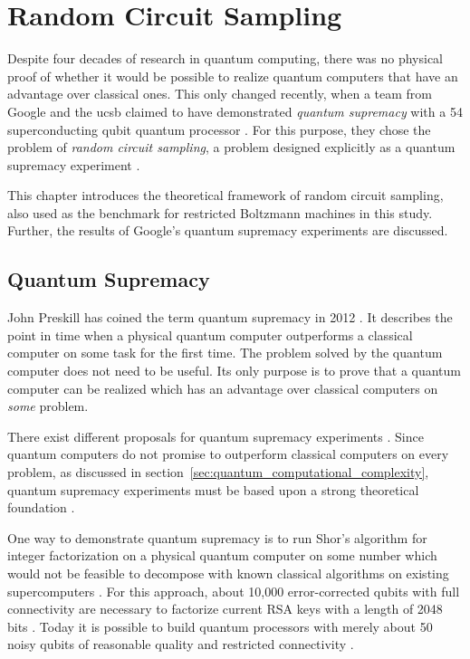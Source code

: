 \chapter{Random Circuit Sampling}
\label{sec:rcs}

Despite four decades
of research in quantum computing, 
there was no physical proof of whether it would be possible to realize quantum computers
that have an advantage over classical ones. This only changed
recently, when a team from Google and the \gls{ucsb} claimed to have demonstrated \textit{quantum supremacy}
with a 54 superconducting qubit quantum processor \cite{martines2019supremacy}. For this purpose, they
chose the problem of \textit{random circuit sampling}, a problem designed explicitly
as a quantum supremacy experiment \cite{Boixo2018supremacy}.

This chapter introduces the theoretical framework of random circuit
sampling, also used as the benchmark for restricted Boltzmann machines in this
study. Further, the results of Google's quantum supremacy experiments are discussed.

\section{Quantum Supremacy}
\label{sec:quantum_supremacy}

John Preskill has coined the term quantum supremacy in 2012
\cite{preskill2012quantum}. It describes the point in time when a physical quantum computer
outperforms a classical computer on some task for the first time. The problem
solved by the quantum computer does not need to be useful. Its only purpose is
to prove that a quantum computer can be realized which has an advantage over
classical computers on \textit{some} problem.

There exist different proposals for quantum supremacy
experiments \cite{shor1997factorisation, aaronson2013boson, Boixo2018supremacy}. Since quantum computers do not promise to outperform classical
computers on every problem, as discussed in section~\ref{sec:quantum_computational_complexity}, 
quantum supremacy experiments must be based upon a strong theoretical foundation \cite{Bernstein93quantumcomplexity}.

One way to demonstrate quantum supremacy is to run Shor's
algorithm for integer factorization \cite{shor1997factorisation} on a physical quantum computer on some number which would not be feasible
to decompose with known classical algorithms on existing supercomputers \cite{martinlopez2011experimental}. 
For this approach, about 10,000 error-corrected qubits with full connectivity are necessary to factorize current 
RSA keys with a length of 2048 bits \cite{Barker15nistspecial,shor1997factorisation}. Today it is possible to
build quantum processors with merely about 50 noisy qubits of reasonable quality and restricted connectivity \cite{martines2019supremacy}.

